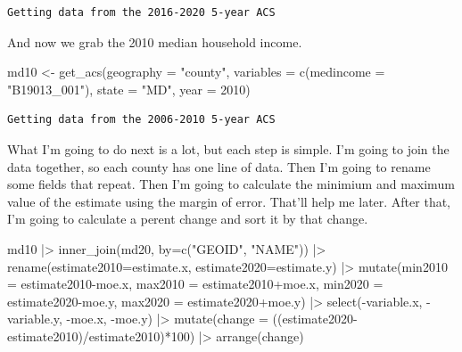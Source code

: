 \documentclass[
  letterpaper,
  DIV=11,
  numbers=noendperiod]{scrreprt}
\newenvironment{Shaded}{\begin{snugshade}}{\end{snugshade}}
\newcommand{\AttributeTok}[1]{\textcolor[rgb]{0.40,0.45,0.13}{#1}}
\newcommand{\DecValTok}[1]{\textcolor[rgb]{0.68,0.00,0.00}{#1}}
\newcommand{\FunctionTok}[1]{\textcolor[rgb]{0.28,0.35,0.67}{#1}}
\newcommand{\NormalTok}[1]{\textcolor[rgb]{0.00,0.23,0.31}{#1}}
\newcommand{\OtherTok}[1]{\textcolor[rgb]{0.00,0.23,0.31}{#1}}
\newcommand{\SpecialCharTok}[1]{\textcolor[rgb]{0.37,0.37,0.37}{#1}}
\newcommand{\StringTok}[1]{\textcolor[rgb]{0.13,0.47,0.30}{#1}}
\begin{document}
\begin{verbatim}
Getting data from the 2016-2020 5-year ACS
\end{verbatim}

And now we grab the 2010 median household income.

\begin{Shaded}
\begin{Highlighting}[]
\NormalTok{md10 }\OtherTok{\textless{}{-}} \FunctionTok{get\_acs}\NormalTok{(}\AttributeTok{geography =} \StringTok{"county"}\NormalTok{,}
              \AttributeTok{variables =} \FunctionTok{c}\NormalTok{(}\AttributeTok{medincome =} \StringTok{"B19013\_001"}\NormalTok{),}
              \AttributeTok{state =} \StringTok{"MD"}\NormalTok{,}
              \AttributeTok{year =} \DecValTok{2010}\NormalTok{)}
\end{Highlighting}
\end{Shaded}

\begin{verbatim}
Getting data from the 2006-2010 5-year ACS
\end{verbatim}

What I'm going to do next is a lot, but each step is simple. I'm going
to join the data together, so each county has one line of data. Then I'm
going to rename some fields that repeat. Then I'm going to calculate the
minimium and maximum value of the estimate using the margin of error.
That'll help me later. After that, I'm going to calculate a perent
change and sort it by that change.

\begin{Shaded}
\begin{Highlighting}[]
\NormalTok{md10 }\SpecialCharTok{|\textgreater{}}
  \FunctionTok{inner\_join}\NormalTok{(md20, }\AttributeTok{by=}\FunctionTok{c}\NormalTok{(}\StringTok{"GEOID"}\NormalTok{, }\StringTok{"NAME"}\NormalTok{)) }\SpecialCharTok{|\textgreater{}}
  \FunctionTok{rename}\NormalTok{(}\AttributeTok{estimate2010=}\NormalTok{estimate.x, }\AttributeTok{estimate2020=}\NormalTok{estimate.y) }\SpecialCharTok{|\textgreater{}}
  \FunctionTok{mutate}\NormalTok{(}\AttributeTok{min2010 =}\NormalTok{ estimate2010}\SpecialCharTok{{-}}\NormalTok{moe.x, }\AttributeTok{max2010 =}\NormalTok{ estimate2010}\SpecialCharTok{+}\NormalTok{moe.x, }\AttributeTok{min2020 =}\NormalTok{ estimate2020}\SpecialCharTok{{-}}\NormalTok{moe.y, }\AttributeTok{max2020 =}\NormalTok{ estimate2020}\SpecialCharTok{+}\NormalTok{moe.y) }\SpecialCharTok{|\textgreater{}}
  \FunctionTok{select}\NormalTok{(}\SpecialCharTok{{-}}\NormalTok{variable.x, }\SpecialCharTok{{-}}\NormalTok{variable.y, }\SpecialCharTok{{-}}\NormalTok{moe.x, }\SpecialCharTok{{-}}\NormalTok{moe.y) }\SpecialCharTok{|\textgreater{}}
  \FunctionTok{mutate}\NormalTok{(}\AttributeTok{change =}\NormalTok{ ((estimate2020}\SpecialCharTok{{-}}\NormalTok{estimate2010)}\SpecialCharTok{/}\NormalTok{estimate2010)}\SpecialCharTok{*}\DecValTok{100}\NormalTok{) }\SpecialCharTok{|\textgreater{}}
  \FunctionTok{arrange}\NormalTok{(change)}
\end{Highlighting}
\end{Shaded}
\end{document}
